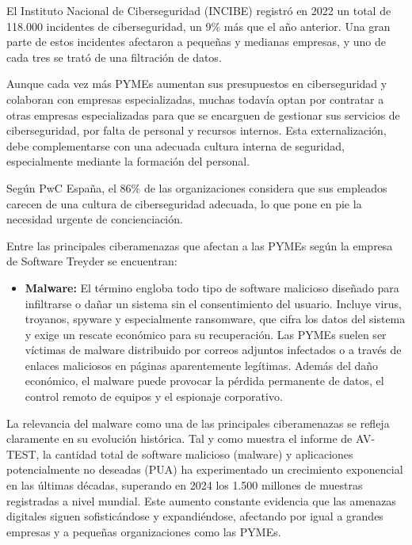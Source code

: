 \documentclass[a4paper, 10pt]{article}
\begin{document}
El Instituto Nacional de Ciberseguridad (INCIBE) registró en 2022 un total de 118.000 incidentes de ciberseguridad, un 9\% más que el año anterior. Una gran parte de estos incidentes afectaron a pequeñas y medianas empresas, y uno de cada tres se trató de una filtración de datos.\cite{incibe2023}
\par\vspace{0.5cm}

Aunque cada vez más PYMEs aumentan sus presupuestos en ciberseguridad y colaboran con empresas especializadas, muchas todavía optan por contratar a otras empresas especializadas para que se encarguen de gestionar sus servicios de ciberseguridad, 
por falta de personal y recursos internos. Esta 
externalización, debe complementarse con una adecuada cultura interna de seguridad, especialmente mediante la formación del personal.
\par\vspace{0.5cm}

Según PwC España, el 86\% de las organizaciones considera que sus empleados carecen de una cultura de ciberseguridad adecuada, lo que pone en pie la necesidad urgente de concienciación.\cite{pow}
\par\vspace{0.5cm}

Entre las principales ciberamenazas que afectan a las PYMEs según la empresa de Software Treyder \cite{treider} se encuentran:

\begin{itemize}
    \item \textbf{Malware:}  
    El término engloba todo tipo de software malicioso diseñado para infiltrarse o dañar un sistema sin el consentimiento del usuario. Incluye virus, troyanos, spyware y especialmente ransomware, que cifra los datos del sistema y exige un rescate económico para su recuperación. Las PYMEs suelen ser víctimas de malware distribuido por correos adjuntos infectados o a través de enlaces maliciosos en páginas aparentemente legítimas. Además del daño económico, el malware puede provocar la pérdida permanente de datos, el control remoto de equipos y el espionaje corporativo.
\end{itemize}

\vspace{0.5cm}

La relevancia del malware como una de las principales ciberamenazas se refleja claramente en su evolución histórica. Tal y como muestra el informe de AV-TEST, la cantidad total de software malicioso (malware) y aplicaciones potencialmente no deseadas (PUA) ha experimentado un crecimiento exponencial en las últimas décadas, superando en 2024 los 1.500 millones de muestras registradas a nivel mundial. Este aumento constante evidencia que las amenazas digitales siguen sofisticándose y expandiéndose, afectando por igual a grandes empresas y a pequeñas organizaciones como las PYMEs.
\end{document}
